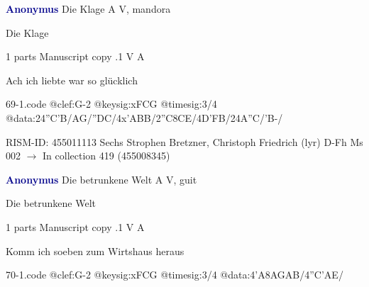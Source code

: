 \documentclass[twocolumn]{book}
\begin{document}
\newline \par \vspace{7pt} \textcolor{darkblue}{\textbf{Anonymus  }}
\newline Die Klage  A  
\newline V, mandora
\newline \begin{itshape}[heading, f.38v:] Die Klage\end{itshape} 
\newline \textcolor{darkblue}{}  1 parts  
\newline Manuscript copy
.1  V  A
\newline \begin{footnotesize} Ach ich liebte war so glücklich \end{footnotesize}  
\begin{filecontents*}{69-1.code}
@clef:G-2
@keysig:xFCG
@timesig:3/4
@data:24''C'B/AG/''DC/4x'ABB/2''C{8CE}/4D'FB/24A''C/'B-/
\end{filecontents*}
\newline
%

\newline RISM-ID: 455011113
\newline Sechs Strophen
\newline Bretzner, Christoph Friedrich  (lyr)
\newline D-Fh  Ms 002
\newline $\rightarrow$ In collection 419 (455008345)

\newline \par \vspace{7pt} \textcolor{darkblue}{\textbf{Anonymus  }}
\newline Die betrunkene Welt  A  
\newline V, guit
\newline \begin{itshape}[heading, f.61v:] Die betrunkene Welt\end{itshape} 
\newline \textcolor{darkblue}{}  1 parts  
\newline Manuscript copy
.1  V  A
\newline \begin{footnotesize} Komm ich soeben zum Wirtshaus heraus \end{footnotesize}  
\begin{filecontents*}{70-1.code}
@clef:G-2
@keysig:xFCG
@timesig:3/4
@data:4'A{8AG}{AB}/4''C'AE/
\end{filecontents*}
\newline
%
\end{document}
